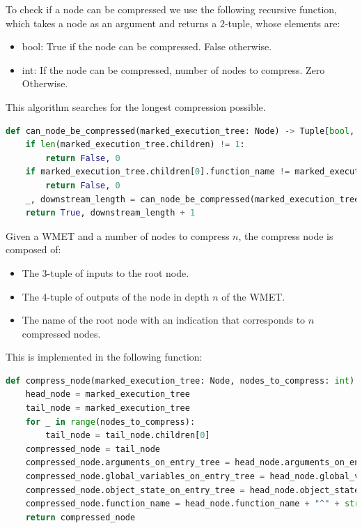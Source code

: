 To check if a node can be compressed we use the following recursive function, which takes a node as an argument and returns a 2-tuple, whose elements are:
\begin{itemize}
    \item bool: True if the node can be compressed. False otherwise.
    \item int: If the node can be compressed, number of nodes to compress. Zero Otherwise. 
\end{itemize}
This algorithm searches for the longest compression possible.
\begin{lstlisting}[language=Python, caption=Checking if node can be compressed]
def can_node_be_compressed(marked_execution_tree: Node) -> Tuple[bool, int]:
    if len(marked_execution_tree.children) != 1:
        return False, 0
    if marked_execution_tree.children[0].function_name != marked_execution_tree.function_name:
        return False, 0
    _, downstream_length = can_node_be_compressed(marked_execution_tree.children[0])
    return True, downstream_length + 1
\end{lstlisting}

Given a WMET and a number of nodes to compress \(n\), the compress node is composed of:
\begin{itemize}
    \item The 3-tuple of inputs to the root node.
    \item The 4-tuple of outputs of the node in depth \(n\) of the WMET.
    \item The name of the root node with an indication that corresponds to \(n\) compressed nodes.
\end{itemize}
This is implemented in the following function:
\begin{lstlisting}[language=Python, caption=Compression node]
def compress_node(marked_execution_tree: Node, nodes_to_compress: int) -> Node:
    head_node = marked_execution_tree
    tail_node = marked_execution_tree
    for _ in range(nodes_to_compress):
        tail_node = tail_node.children[0]
    compressed_node = tail_node
    compressed_node.arguments_on_entry_tree = head_node.arguments_on_entry_tree
    compressed_node.global_variables_on_entry_tree = head_node.global_variables_on_entry_tree
    compressed_node.object_state_on_entry_tree = head_node.object_state_on_entry_tree
    compressed_node.function_name = head_node.function_name + "^" + str(nodes_to_compress + 1)
    return compressed_node
\end{lstlisting}

